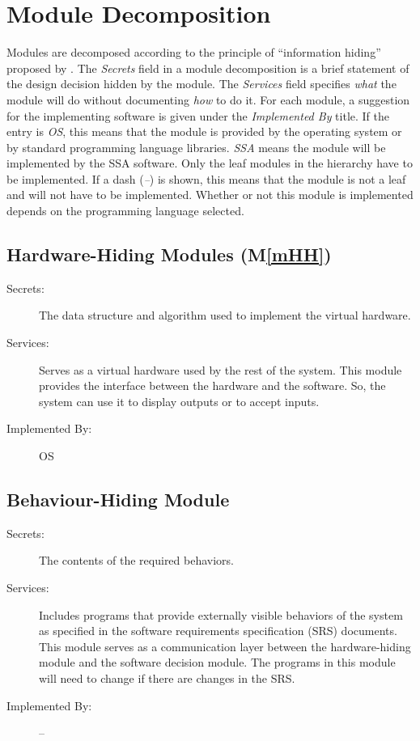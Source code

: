 \documentclass[12pt]{article}
\newcommand{\mref}[1]{M\ref{#1}}
\newcommand{\progname}[1]{SSA}
\begin{document}
\section{Module Decomposition} \label{SecMD}

\hspace{3ex}Modules are decomposed according to the principle of
``information hiding'' proposed by \citet{ParnasEtAl1984}. The
\emph{Secrets} field in a module decomposition is a brief statement of
the design decision hidden by the module. The \emph{Services} field
specifies \emph{what} the module will do without documenting
\emph{how} to do it. For each module, a suggestion for the
implementing software is given under the \emph{Implemented By}
title. If the entry is \emph{OS}, this means that the module is
provided by the operating system or by standard programming language
libraries. \emph{\progname{}} means the module will be implemented by
the \progname{} software. Only the leaf modules in the hierarchy have
to be implemented. If a dash (\emph{--}) is shown, this means that the
module is not a leaf and will not have to be implemented. Whether or
not this module is implemented depends on the programming language
selected.

\subsection{Hardware-Hiding Modules (\mref{mHH})}

\begin{description}
\item[Secrets:]The data structure and algorithm used to implement the
  virtual hardware.
\item[Services:]Serves as a virtual hardware used by the rest of the
  system. This module provides the interface between the hardware and
  the software. So, the system can use it to display outputs or to
  accept inputs.
\item[Implemented By:] OS
\end{description}

\subsection{Behaviour-Hiding Module}

\begin{description}
\item[Secrets:]The contents of the required behaviors.
\item[Services:]Includes programs that provide externally visible
  behaviors of the system as specified in the software requirements
  specification (SRS) documents. This module serves as a communication
  layer between the hardware-hiding module and the software decision
  module. The programs in this module will need to change if there are
  changes in the SRS.
\item[Implemented By:] --
\end{description}
\end{document}
